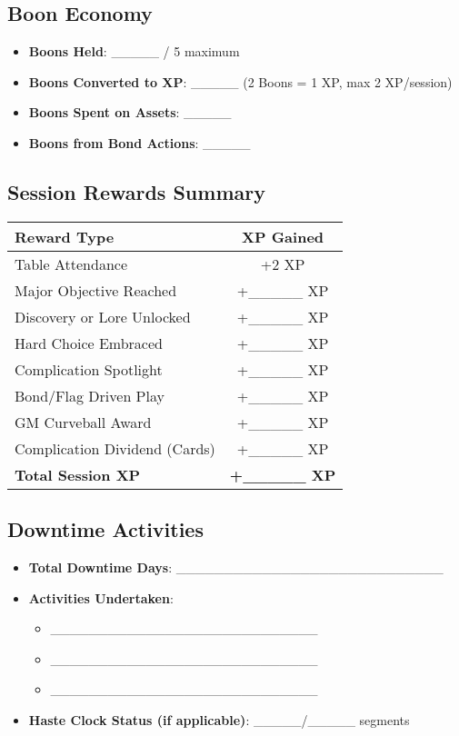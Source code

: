 \subsection{Boon Economy}

\begin{itemize}
    \item \textbf{Boons Held}: \_\_\_\_\_ / 5 maximum
    \item \textbf{Boons Converted to XP}: \_\_\_\_\_ (2 Boons = 1 XP, max 2 XP/session)
    \item \textbf{Boons Spent on Assets}: \_\_\_\_\_
    \item \textbf{Boons from Bond Actions}: \_\_\_\_\_
\end{itemize}

\subsection{Session Rewards Summary}

\begin{tabular}{|p{5cm}|c|}
\hline
\textbf{Reward Type} & \textbf{XP Gained} \\
\hline
Table Attendance & +2 XP \\
Major Objective Reached & +\_\_\_\_\_ XP \\
Discovery or Lore Unlocked & +\_\_\_\_\_ XP \\
Hard Choice Embraced & +\_\_\_\_\_ XP \\
Complication Spotlight & +\_\_\_\_\_ XP \\
Bond/Flag Driven Play & +\_\_\_\_\_ XP \\
GM Curveball Award & +\_\_\_\_\_ XP \\
Complication Dividend (Cards) & +\_\_\_\_\_ XP \\
\textbf{Total Session XP} & \textbf{+\_\_\_\_\_ XP} \\
\hline
\end{tabular}

\subsection{Downtime Activities}

\begin{itemize}
    \item \textbf{Total Downtime Days}: \_\_\_\_\_\_\_\_\_\_\_\_\_\_\_\_\_\_\_\_\_\_\_\_\_\_\_\_
    \item \textbf{Activities Undertaken}: 
    \begin{itemize}
        \item \_\_\_\_\_\_\_\_\_\_\_\_\_\_\_\_\_\_\_\_\_\_\_\_\_\_\_\_
        \item \_\_\_\_\_\_\_\_\_\_\_\_\_\_\_\_\_\_\_\_\_\_\_\_\_\_\_\_
        \item \_\_\_\_\_\_\_\_\_\_\_\_\_\_\_\_\_\_\_\_\_\_\_\_\_\_\_\_
    \end{itemize}
    \item \textbf{Haste Clock Status (if applicable)}: \_\_\_\_\_/\_\_\_\_\_ segments
\end{itemize}

